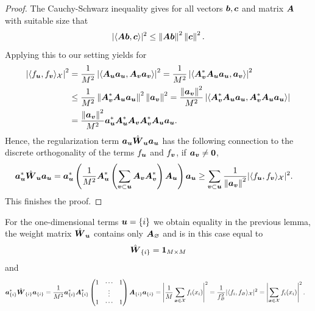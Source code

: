 \documentclass{article}
\renewcommand{\vec}[1]{\ensuremath \mathbf{\boldsymbol{#1}}}
\newcommand{\X}{\ensuremath{\mathcal{X}}}
\newcommand{\x}{\ensuremath{\vec x}}
\newcommand{\norm}[1]{\left\lVert {#1} \right\rVert}    %
\theoremstyle{definition}
\numberwithin{equation}{section}
\begin{document}
\begin{proof}
The Cauchy-Schwarz inequality gives for all vectors $\vec b,\vec c$ and matrix $\vec A$ with suitable size that 
$$|\langle \vec A \vec b ,\vec c\rangle |^2\leq  \norm{\vec A \vec b }^2\norm{\vec c}^2.$$
Applying this to our setting yields for
\begin{align*}
\left|\langle f_{\vec u} ,f_{\vec v} \rangle_{\X}\right|^2 
&= \frac{1}{M^2} \left|\langle \vec A_{\vec u} \vec a_{\vec u},\vec A_{\vec v} \vec a_{\vec v}  \rangle\right|^2
= \frac{1}{M^2} \left|\langle \vec A_{\vec v}^*\vec A_{\vec u} \vec a_{\vec u}, \vec a_{\vec v}  \rangle\right|^2\\
&\leq \frac{1}{M^2} \norm{\vec A_{\vec v}^*\vec A_{\vec u} \vec a_{\vec u}}^2\norm{\vec a_{\vec v}}^2  
= \frac{\norm{\vec a_{\vec v}}^2 }{M^2}\left| \langle \vec A_{\vec v}^*\vec A_{\vec u} \vec a_{\vec u}, \vec A_{\vec v}^*\vec A_{\vec u} \vec a_{\vec u} \rangle\right|\\
&= \frac{\norm{\vec a_{\vec v}}^2 }{M^2} \vec a_{\vec u}^* \vec A_{\vec u}^*\vec A_{\vec v}\vec A_{\vec v}^* \vec A_\vec u\vec a_{\vec u}.
\end{align*}
Hence, the regularization term $\vec a_{\vec u} \hat{\vec W}_{\vec u} \vec a_{\vec u}$ has the following connection to the discrete orthogonality of the terms $f_{\vec u}$ and $f_{\vec v}$, if $\vec a_{\vec v} \neq \vec 0$,
\begin{align*}
\vec a_{\vec u}^*\hat{\vec W}_{\vec u} \vec a_{\vec u}
&=\vec a_{\vec u}^* \left( \frac{1}{M^2}\vec A_{\vec u}^* \left(\sum_{\vec v\subset \vec u} \vec A_{\vec v}\vec A_{\vec v}^* \right) \vec A_\vec u \right) \vec a_{\vec u}
\geq \sum_{\vec v\subset \vec u} \frac{1}{\norm{\vec a_{\vec v}}^2}|\langle f_{\vec u},f_{\vec v}\rangle_{\X} |^2.
\end{align*}
This finishes the proof.
\end{proof}
For the one-dimensional terms $\vec u = \{i\}$ we obtain equality in the previous lemma, the weight matrix $\hat{\vec W}_{\vec u}$ contains only $\vec A_{\varnothing}$ and is in this case equal to
$$\hat{\vec W}_{\{i\}} = \vec 1_{M\times M}$$ 
and
\begin{align*}
\vec a_{\{i\}}^*\hat{\vec W}_{\{i\}}\vec a_{\{i\}} 
&=\frac{1}{M^2}\vec a_{\{i\}}^*\vec A_{\{i\}}^*\begin{pmatrix}1&\cdots &1  \\ &\vdots&\\ 1&\cdots& 1 \end{pmatrix}\vec A_{\{i\}}\vec a_{\{i\}}
= \left|\frac{1}{M}\sum_{\x\in \X} f_i(x_i) \right|^2 = \frac{1}{f_{\varnothing}^2}|\langle f_{i}, f_{\varnothing}\rangle_{\X}|^2
=\left|\sum_{\x\in \X}f_i(x_i)\right|^2.
\end{align*}
\end{document}
